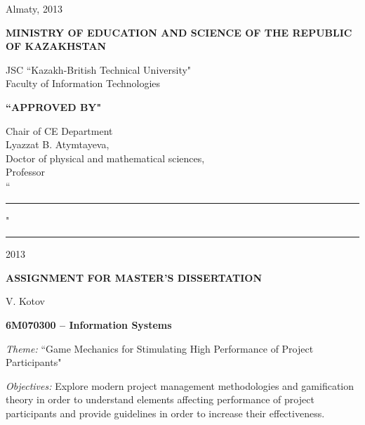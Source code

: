 \begin{titlepage}
\begin{center}
    \end{center}


    \begin{center}
        \vfill
        Almaty, 2013
    \end{center}

    \pagebreak


    \begin{center}
    {\bf{\MakeUppercase{Ministry of education and science of the republic of Kazakhstan}}

        \vspace{14pt}

        JSC ``Kazakh-British Technical University"\\
        Faculty of Information Technologies}

        \vspace{14pt}
        
        \begin{flushright}
            {\bf \MakeUppercase{``Approved by"}}

            Chair of CE Department\\
            Lyazzat B. Atymtayeva,\\
            Doctor of physical and mathematical sciences,\\
            Professor\\

            \vspace{0.5\baselineskip}
            ``\rule{2em}{0.4pt}" \rule{8em}{0.4pt} 2013\\
            \end{flushright}
        
        {\bf
        \MakeUppercase{Assignment for master's dissertation}}

    \end{center}

    \setlength{\parindent}{0pt}
    \setlength{\parskip}{1ex plus 0.5ex minus 0.2ex}

    V. Kotov

    {\bf 6M070300 -- Information Systems}

    \emph{Theme:} ``Game Mechanics for Stimulating High Performance of Project Participants"
    
   \emph{Objectives:}
    Explore modern project management methodologies and gamification theory in order to understand elements affecting performance of project participants and provide guidelines in order to increase their effectiveness.
    

\end{titlepage}

